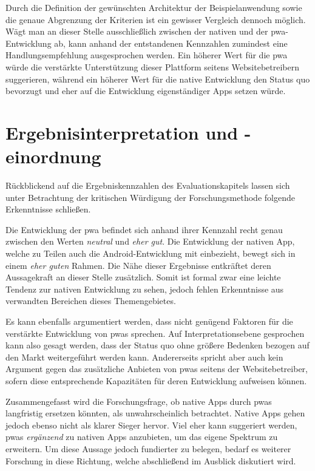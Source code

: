 Durch die Definition der gewünschten Architektur der Beispielanwendung sowie die genaue Abgrenzung der Kriterien ist ein gewisser Vergleich dennoch möglich. Wägt man an dieser Stelle ausschließlich zwischen der nativen und der \ac{pwa}-Entwicklung ab, kann anhand der entstandenen Kennzahlen zumindest eine Handlungsempfehlung ausgesprochen werden. Ein höherer Wert für die \ac{pwa} würde die verstärkte Unterstützung dieser Plattform seitens Websitebetreibern suggerieren, während ein höherer Wert für die native Entwicklung den Status quo bevorzugt und eher auf die Entwicklung eigenständiger Apps setzen würde.

\section{Ergebnisinterpretation und -einordnung}
Rückblickend auf die Ergebniskennzahlen des Evaluationskapitels lassen sich unter Betrachtung der kritischen Würdigung der Forschungsmethode folgende Erkenntnisse schließen.

Die Entwicklung der \ac{pwa} befindet sich anhand ihrer Kennzahl recht genau zwischen den Werten \textit{neutral} und \textit{eher gut}. Die Entwicklung der nativen App, welche zu Teilen auch die Android-Entwicklung mit einbezieht, bewegt sich in einem \textit{eher guten} Rahmen. Die Nähe dieser Ergebnisse entkräftet deren Aussagekraft an dieser Stelle zusätzlich. Somit ist formal zwar eine leichte Tendenz zur nativen Entwicklung zu sehen, jedoch fehlen Erkenntnisse aus verwandten Bereichen dieses Themengebietes.

Es kann ebenfalls argumentiert werden, dass nicht genügend Faktoren für die verstärkte Entwicklung von \acp{pwa} sprechen. Auf Interpretationsebene gesprochen kann also gesagt werden, dass der Status quo ohne größere Bedenken bezogen auf den Markt weitergeführt werden kann. Andererseits spricht aber auch kein Argument gegen das zusätzliche Anbieten von \acp{pwa} seitens der Websitebetreiber, sofern diese entsprechende Kapazitäten für deren Entwicklung aufweisen können.

Zusammengefasst wird die Forschungsfrage, ob native Apps durch \acp{pwa} langfristig ersetzen könnten, als unwahrscheinlich betrachtet. Native Apps gehen jedoch ebenso nicht als klarer Sieger hervor. Viel eher kann suggeriert werden, \acp{pwa} \textit{ergänzend} zu nativen Apps anzubieten, um das eigene Spektrum zu erweitern. Um diese Aussage jedoch fundierter zu belegen, bedarf es weiterer Forschung in diese Richtung, welche abschließend im Ausblick diskutiert wird.

